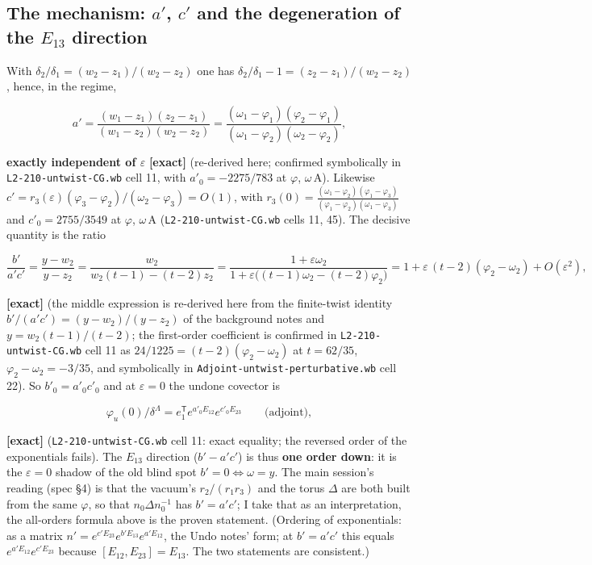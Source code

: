 \documentclass[10pt]{article}
\newcommand{\nb}[1]{\texttt{#1}}
\begin{document}
\subsection{The mechanism: $a'$, $c'$ and the degeneration of the $E_{13}$ direction}\label{sec:mech}

With $\delta_2/\delta_1=(w_2-z_1)/(w_2-z_2)$ one has $\delta_2/\delta_1-1=(z_2-z_1)/(w_2-z_2)$, hence, in the regime,

\[
a'=\frac{(w_1-z_1)(z_2-z_1)}{(w_1-z_2)(w_2-z_2)}=\frac{(\omega_1-\varphi_1)(\varphi_2-\varphi_1)}{(\omega_1-\varphi_2)(\omega_2-\varphi_2)},
\]

\textbf{exactly independent of $\varepsilon$} \textbf{[exact]} (re-derived here; confirmed symbolically in \nb{L2-\allowbreak{}210-\allowbreak{}untwist-\allowbreak{}CG.\allowbreak{}wb} cell 11, with $a'_0=-2275/783$ at $\varphi$, $\omega\,\mathrm{A}$). Likewise $c'=r_3(\varepsilon)(\varphi_3-\varphi_2)/(\omega_2-\varphi_3)=O(1)$, with $r_3(0)=\frac{(\omega_1-\varphi_2)(\varphi_1-\varphi_3)}{(\varphi_1-\varphi_2)(\omega_1-\varphi_3)}$ and $c'_0=2755/3549$ at $\varphi$, $\omega\,\mathrm{A}$ (\nb{L2-\allowbreak{}210-\allowbreak{}untwist-\allowbreak{}CG.\allowbreak{}wb} cells 11, 45). The decisive quantity is the ratio

\[
\frac{b'}{a'c'}=\frac{y-w_2}{y-z_2}=\frac{w_2}{w_2(t-1)-(t-2)z_2}=\frac{1+\varepsilon\omega_2}{1+\varepsilon\bigl((t-1)\omega_2-(t-2)\varphi_2\bigr)}=1+\varepsilon\,(t-2)(\varphi_2-\omega_2)+O(\varepsilon^2),
\]

\textbf{[exact]} (the middle expression is re-derived here from the finite-twist identity $b'/(a'c')=(y-w_2)/(y-z_2)$ of the background notes and $y=w_2(t-1)/(t-2)$; the first-order coefficient is confirmed in \nb{L2-\allowbreak{}210-\allowbreak{}untwist-\allowbreak{}CG.\allowbreak{}wb} cell 11 as $24/1225=(t-2)(\varphi_2-\omega_2)$ at $t=62/35$, $\varphi_2-\omega_2=-3/35$, and symbolically in \nb{Adjoint-\allowbreak{}untwist-\allowbreak{}perturbative.\allowbreak{}wb} cell 22). So $b'_0=a'_0c'_0$ and at $\varepsilon=0$ the undone covector is

\[
\varphi_u(0)/\delta^\Lambda=e_1^{\mathsf T}e^{a'_0E_{12}}e^{c'_0E_{23}}\qquad\text{(adjoint)},
\]

\textbf{[exact]} (\nb{L2-\allowbreak{}210-\allowbreak{}untwist-\allowbreak{}CG.\allowbreak{}wb} cell 11: exact equality; the reversed order of the exponentials fails). The $E_{13}$ direction ($b'-a'c'$) is thus \textbf{one order down}: it is the $\varepsilon=0$ shadow of the old blind spot $b'=0\Leftrightarrow\omega=y$. The main session's reading (spec \S{}4) is that the vacuum's $r_2/(r_1r_3)$ and the torus $\Delta$ are both built from the same $\varphi$, so that $n_0\Delta n_0^{-1}$ has $b'=a'c'$; I take that as an interpretation, the all-orders formula above is the proven statement. (Ordering of exponentials: as a matrix $n'=e^{c'E_{23}}e^{b'E_{13}}e^{a'E_{12}}$, the Undo notes' form; at $b'=a'c'$ this equals $e^{a'E_{12}}e^{c'E_{23}}$ because $[E_{12},E_{23}]=E_{13}$. The two statements are consistent.)
\end{document}
